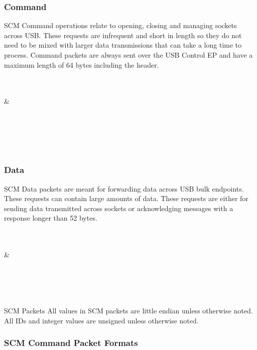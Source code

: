 \documentclass[10pt]{article}
\begin{document}
	\subsubsection{Command}
	SCM Command operations relate to opening, closing and managing sockets across USB. These requests are infrequent and short in length so they do not need to be mixed with larger data transmissions that can take a long time to process. Command packets are always sent over the USB Control EP and have a maximum length of 64 bytes including the header.\\
	\\
	\begin{bytefield}[bitwidth=1.7em]{32}
		 \\
		 &
		 \\
		 \\
		 \\
		 \\
	\end{bytefield}\\ 
	\subsubsection{Data}
	SCM Data packets are meant for forwarding data across USB bulk endpoints. These requests can contain large amounts of data. These requests are either for sending data transmitted across sockets or acknowledging messages with a response longer than 52 bytes.\\
	\\
	\begin{bytefield}[bitwidth=1.7em]{32}
		 \\
		 &
		 \\
		 \\
		 \\
		 \\
	\end{bytefield}\\
	{SCM Packets} \mbox{}
	All values in SCM packets are little endian unless otherwise noted. All IDs and integer values are unsigned unless otherwise noted.
	\subsubsection{SCM Command Packet Formats}
	\setcounter{secnumdepth}{5}
\end{document}
